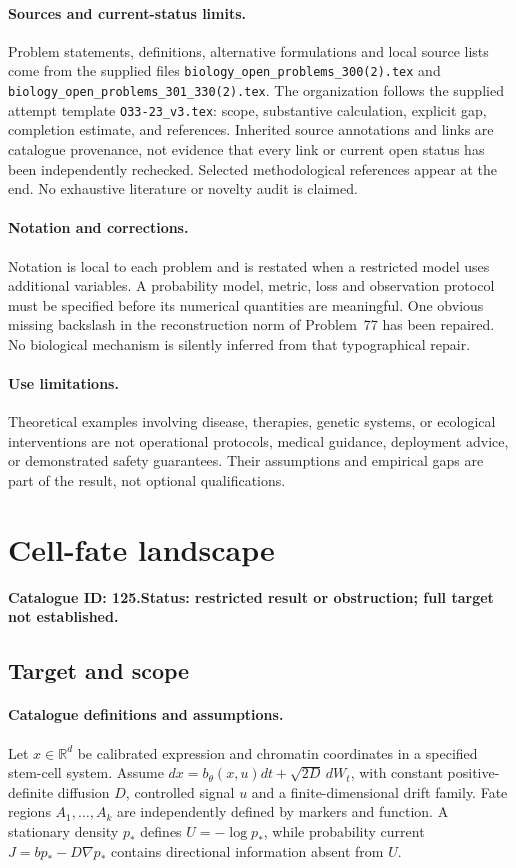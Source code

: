 \documentclass[11pt]{article}
\newcommand{\R}{\mathbb R}
\providecommand{\R}{\mathbb R}
\begin{document}
\paragraph{Sources and current-status limits.}
Problem statements, definitions, alternative formulations and local source lists
come from the supplied files
\texttt{biology\_open\_problems\_300(2).tex} and
\texttt{biology\_open\_problems\_301\_330(2).tex}.
The organization follows the supplied attempt template
\texttt{O33-23\_v3.tex}: scope, substantive calculation, explicit gap,
completion estimate, and references. Inherited source annotations and links are
catalogue provenance, not evidence that every link or current open status has
been independently rechecked. Selected methodological references appear at the
end. No exhaustive literature or novelty audit is claimed.

\paragraph{Notation and corrections.}
Notation is local to each problem and is restated when a restricted model uses
additional variables. A probability model, metric, loss and observation protocol
must be specified before its numerical quantities are meaningful. One obvious
missing backslash in the reconstruction norm of Problem~77 has been repaired.
No biological mechanism is silently inferred from that typographical repair.

\paragraph{Use limitations.}
Theoretical examples involving disease, therapies, genetic systems, or ecological
interventions are not operational protocols, medical guidance, deployment advice,
or demonstrated safety guarantees. Their assumptions and empirical gaps are part
of the result, not optional qualifications.

\setcounter{section}{124}
\section{Cell-fate landscape}
\label{prob:125}
\noindent\textbf{Catalogue ID: 125.}\quad \textbf{Status: restricted result or obstruction; full target not established.}
\subsection{Target and scope}
\paragraph{Catalogue definitions and assumptions.}
Let $x\in\R^d$ be calibrated expression and chromatin coordinates in a specified stem-cell system. Assume $dx=b_\theta(x,u)dt+\sqrt{2D}\,dW_t$, with constant positive-definite diffusion $D$, controlled signal $u$ and a finite-dimensional drift family. Fate regions $A_1,\ldots,A_k$ are independently defined by markers and function. A stationary density $p_*$ defines $U=-\log p_*$, while probability current $J=b p_*-D\nabla p_*$ contains directional information absent from $U$.
\end{document}
